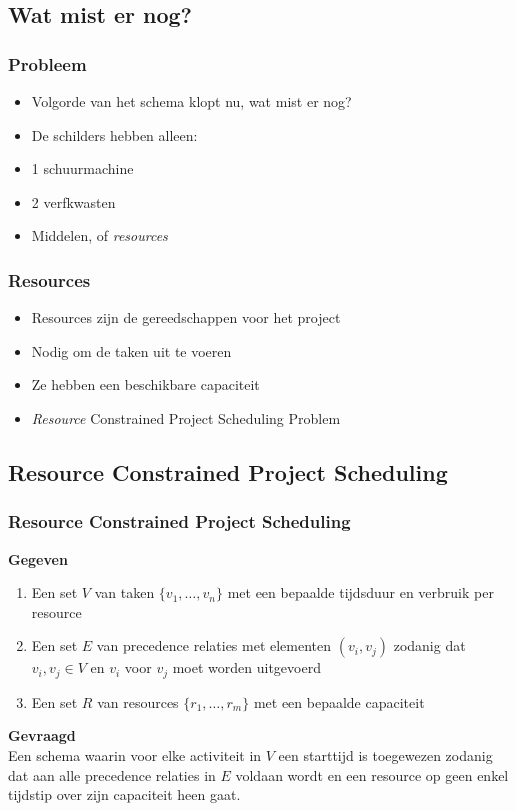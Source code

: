 \documentclass{beamer}
\theoremstyle{definition}
\begin{document}
\subsection{Wat mist er nog?}
\begin{frame}
	\frametitle{Probleem}
	\begin{itemize}
		\item Volgorde van het schema klopt nu, wat mist er nog?
		\item<2->  De schilders hebben alleen:
		\item<2-> 1 schuurmachine
		\item<2-> 2 verfkwasten
		\item<3-> Middelen, of \emph{resources}
	\end{itemize}
\end{frame}

\begin{frame}
	\frametitle{Resources}
	\begin{itemize}
		\item Resources zijn de gereedschappen voor het project
		\item Nodig om de taken uit te voeren
		\item Ze hebben een beschikbare capaciteit
		\item \emph{Resource} Constrained Project Scheduling Problem
	\end{itemize}
\end{frame}

\subsection{Resource Constrained Project Scheduling}
\begin{frame}
	\frametitle{Resource Constrained Project Scheduling}
	\textbf{Gegeven}
	\begin{enumerate}
		\item Een set $V$ van taken $\{v_1,\dots,v_n\}$ met een bepaalde tijdsduur en verbruik per resource
		\item Een set $E$ van precedence relaties met elementen $(v_i, v_j)$ zodanig dat $v_i, v_j \in V$ en $v_i$ voor $v_j$ moet worden uitgevoerd
		\item Een set $R$ van resources $\{r_1, \ldots, r_m\}$ met een bepaalde capaciteit
	\end{enumerate}
	
	\textbf{Gevraagd}\\
	Een schema waarin voor elke activiteit in $V$ een starttijd is toegewezen zodanig dat aan alle precedence relaties in $E$ voldaan wordt en een resource op geen enkel tijdstip over zijn capaciteit heen gaat.
\end{frame}
\end{document}
